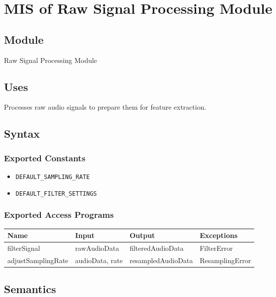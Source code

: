 \documentclass[12pt, titlepage]{article}
\begin{document}
\section{MIS of Raw Signal Processing Module} \label{M4}  

\subsection{Module}  
Raw Signal Processing Module  

\subsection{Uses}  
Processes raw audio signals to prepare them for feature extraction.  

\subsection{Syntax}  

\subsubsection{Exported Constants}  
\begin{itemize}
    \item \texttt{DEFAULT\_SAMPLING\_RATE}  
    \item \texttt{DEFAULT\_FILTER\_SETTINGS}  
\end{itemize}  

\subsubsection{Exported Access Programs}  
\begin{center}  
\begin{tabular}{|p{4cm}|p{3cm}|p{4cm}|p{3cm}|}  
\hline  
\textbf{Name} & \textbf{Input} & \textbf{Output} & \textbf{Exceptions} \\  
\hline  
filterSignal & rawAudioData & filteredAudioData & FilterError \\  
adjustSamplingRate & audioData, rate & resampledAudioData & ResamplingError \\  
\hline  
\end{tabular}  
\end{center}  

\subsection{Semantics}  
\end{document}

